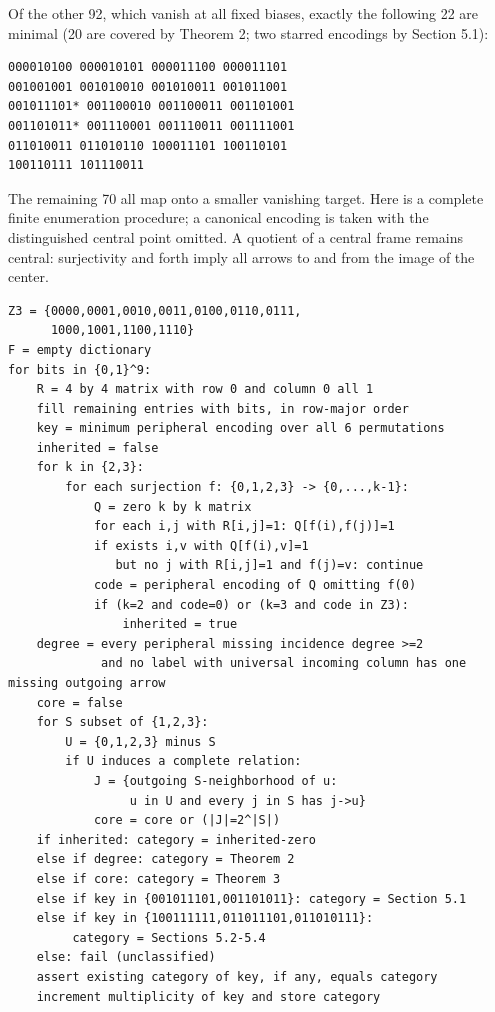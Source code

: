 \documentclass[11pt]{article}
\begin{document}
Of the other 92, which vanish at all fixed biases, exactly the following 22 are minimal (20 are covered by Theorem 2; two starred encodings by Section 5.1):

\begin{Verbatim}[fontsize=\small]
000010100 000010101 000011100 000011101
001001001 001010010 001010011 001011001
001011101* 001100010 001100011 001101001
001101011* 001110001 001110011 001111001
011010011 011010110 100011101 100110101
100110111 101110011
\end{Verbatim}

The remaining 70 all map onto a smaller vanishing target. Here is a complete finite enumeration procedure; a canonical encoding is taken with the distinguished central point omitted. A quotient of a central frame remains central: surjectivity and forth imply all arrows to and from the image of the center.

\begin{Verbatim}[fontsize=\footnotesize,breaklines=true]
Z3 = {0000,0001,0010,0011,0100,0110,0111,
      1000,1001,1100,1110}
F = empty dictionary
for bits in {0,1}^9:
    R = 4 by 4 matrix with row 0 and column 0 all 1
    fill remaining entries with bits, in row-major order
    key = minimum peripheral encoding over all 6 permutations
    inherited = false
    for k in {2,3}:
        for each surjection f: {0,1,2,3} -> {0,...,k-1}:
            Q = zero k by k matrix
            for each i,j with R[i,j]=1: Q[f(i),f(j)]=1
            if exists i,v with Q[f(i),v]=1
               but no j with R[i,j]=1 and f(j)=v: continue
            code = peripheral encoding of Q omitting f(0)
            if (k=2 and code=0) or (k=3 and code in Z3):
                inherited = true
    degree = every peripheral missing incidence degree >=2
             and no label with universal incoming column has one missing outgoing arrow
    core = false
    for S subset of {1,2,3}:
        U = {0,1,2,3} minus S
        if U induces a complete relation:
            J = {outgoing S-neighborhood of u:
                 u in U and every j in S has j->u}
            core = core or (|J|=2^|S|)
    if inherited: category = inherited-zero
    else if degree: category = Theorem 2
    else if core: category = Theorem 3
    else if key in {001011101,001101011}: category = Section 5.1
    else if key in {100111111,011011101,011010111}:
         category = Sections 5.2-5.4
    else: fail (unclassified)
    assert existing category of key, if any, equals category
    increment multiplicity of key and store category
\end{Verbatim}
\end{document}

